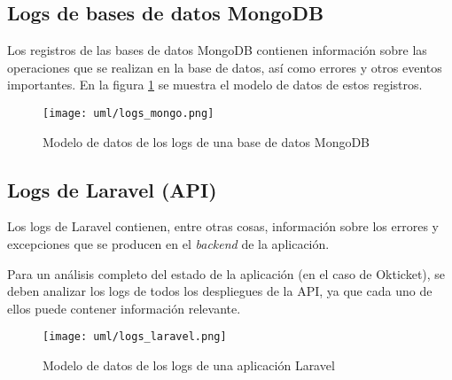 \newpage{}
\subsection{Logs de bases de datos MongoDB}
Los registros de las bases de datos MongoDB contienen información sobre las
operaciones que se realizan en la base de datos, así como errores y otros
eventos importantes. En la figura \ref{fig:logs_mongo} se muestra el modelo de
datos de estos registros.

\begin{figure}[H]
	\centering
	\texttt{[image: uml/logs\_mongo.png]}
	\caption{Modelo de datos de los logs de una base de datos MongoDB}
	\label{fig:logs_mongo}
\end{figure}


\newpage{}
\subsection{Logs de Laravel (API)}
Los logs de Laravel contienen, entre otras cosas, información sobre los
errores y excepciones que se producen en el \textit{backend} de la
aplicación.

Para un análisis completo del estado de la aplicación (en el caso de
Okticket), se deben analizar los logs de todos los despliegues de la
API, ya que cada uno de ellos puede contener información relevante.

\begin{figure}[H]
	\centering
	\texttt{[image: uml/logs\_laravel.png]}
	\caption{Modelo de datos de los logs de una aplicación Laravel}
	\label{fig:logs_laravel}
\end{figure}
